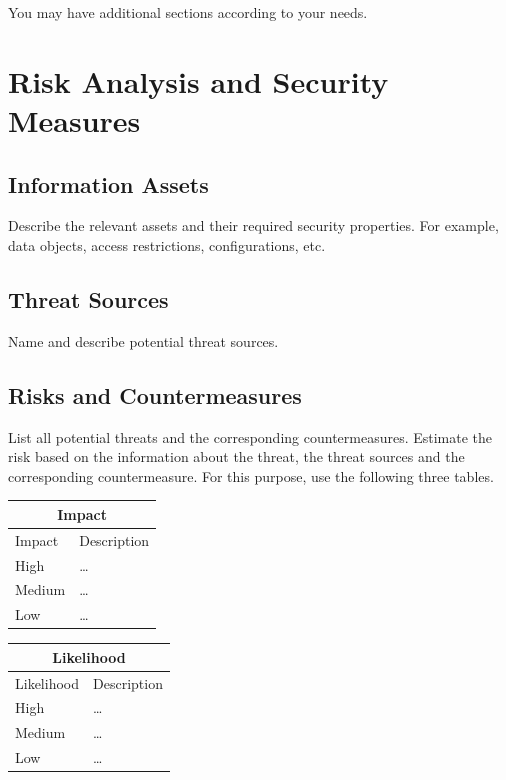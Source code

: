 \documentclass{article}
\begin{document}
You may have additional sections according to your needs.


\section{Risk Analysis and Security Measures}

\subsection{Information Assets}

Describe the relevant assets and their required security
  properties. For example, data objects, access restrictions,
  configurations, etc.

\subsection{Threat Sources}

Name and describe potential threat sources.

\subsection{Risks and Countermeasures}

List all potential threats and the
  corresponding countermeasures. Estimate the risk based on 
  the information about the threat, the threat sources and the 
  corresponding countermeasure. For this purpose, use the following three
  tables.


\begin{center}
\begin{tabular}{|l|l|}
\hline
\multicolumn{2}{|c|}{\bf Impact} \\
\hline
Impact & Description \\
\hline
\hline
High   & \hspace*{20pt}\ldots \\
\hline
Medium & \hspace*{20pt}\ldots \\
\hline
Low   & \hspace*{20pt}\ldots \\
\hline
\end{tabular}
%
%
\begin{tabular}{|l|l|}
\hline
\multicolumn{2}{|c|}{\bf Likelihood} \\
\hline
Likelihood & Description \\
\hline
\hline
High   & \hspace*{20pt}\ldots \\
\hline
Medium & \hspace*{20pt}\ldots \\
\hline
Low   & \hspace*{20pt}\ldots \\
\hline
\end{tabular}
\end{center}
\end{document}
